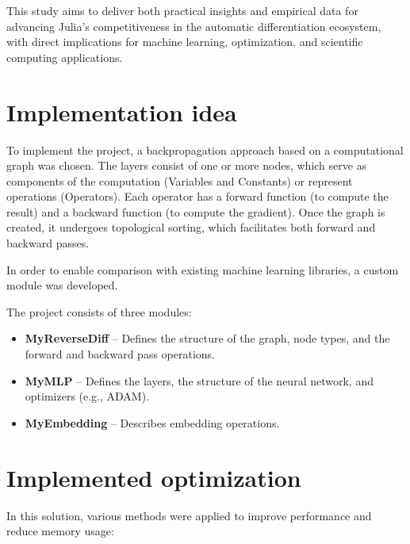\documentclass[conference]{IEEEtran}
\begin{document}
This study aims to deliver both practical insights and empirical data for advancing 
Julia's competitiveness in the automatic differentiation ecosystem, 
with direct implications for machine learning, optimization, 
and scientific computing applications.

\section{Implementation idea}
To implement the project, a backpropagation approach based on a computational graph was chosen. The layers consist of one or more nodes, which serve as components of the computation (Variables and Constants) or represent operations (Operators). Each operator has a forward function (to compute the result) and a backward function (to compute the gradient). Once the graph is created, it undergoes topological sorting, which facilitates both forward and backward passes.

In order to enable comparison with existing machine learning libraries, a custom module was developed. 

The project consists of three modules:

\begin{itemize}
    \item \textbf{MyReverseDiff} – Defines the structure of the graph, node types, and the forward and backward pass operations.
    \item \textbf{MyMLP} – Defines the layers, the structure of the neural network, and optimizers (e.g., ADAM).
    \item \textbf{MyEmbedding} – Describes embedding operations.
\end{itemize}

\section{Implemented optimization}

In this solution, various methods were applied to improve performance and reduce memory usage:
\end{document}
